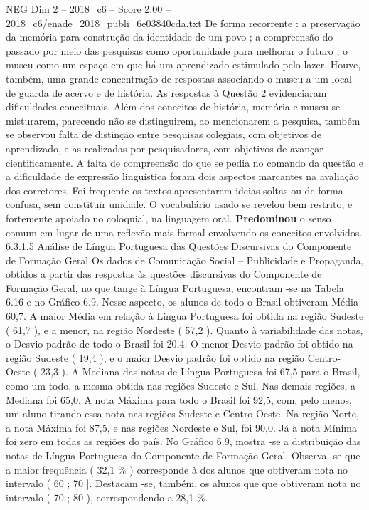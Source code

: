 \begin{textsample}{NEG Dim 2 – 2018\_c6 – Score 2.00 – 2018\_c6/enade\_2018\_publi\_6e03840cda.txt}
De forma recorrente : a preservação da memória para construção da identidade de um povo ; a compreensão do passado por meio das pesquisas como oportunidade para melhorar o futuro ; o museu como um espaço em que há um aprendizado estimulado pelo lazer.
Houve, também, uma grande concentração de respostas associando o museu a um local de guarda de acervo e de história.
As respostas à Questão 2 evidenciaram dificuldades conceituais.
Além dos conceitos de história, memória e museu se misturarem, parecendo não se distinguirem, ao mencionarem a pesquisa, também se observou falta de distinção entre pesquisas colegiais, com objetivos de aprendizado, e as realizadas por pesquisadores, com objetivos de avançar cientificamente.
A falta de compreensão do que se pedia no comando da questão e a dificuldade de expressão linguística foram dois aspectos marcantes na avaliação dos corretores.
Foi frequente os textos apresentarem ideias soltas ou de forma confusa, sem constituir unidade.
O vocabulário usado se revelou bem restrito, e fortemente apoiado no coloquial, na linguagem oral. \textbf{Predominou} o senso comum em lugar de uma reflexão mais formal envolvendo os conceitos envolvidos. 6.3.1.5 Análise de Língua Portuguesa das Questões Discursivas do Componente de Formação Geral Os dados de Comunicação Social – Publicidade e Propaganda, obtidos a partir das respostas às questões discursivas do Componente de Formação Geral, no que tange à Língua Portuguesa, encontram -se na Tabela 6.16 e no Gráfico 6.9.
Nesse aspecto, os alunos de todo o Brasil obtiveram Média 60,7.
A maior Média em relação à Língua Portuguesa foi obtida na região Sudeste ( 61,7 ), e a menor, na região Nordeste ( 57,2 ).
Quanto à variabilidade das notas, o Desvio padrão de todo o Brasil foi 20,4.
O menor Desvio padrão foi obtido na região Sudeste ( 19,4 ), e o maior Desvio padrão foi obtido na região Centro-Oeste ( 23,3 ).
A Mediana das notas de Língua Portuguesa foi 67,5 para o Brasil, como um todo, a mesma obtida nas regiões Sudeste e Sul.
Nas demais regiões, a Mediana foi 65,0.
A nota Máxima para todo o Brasil foi 92,5, com, pelo menos, um aluno tirando essa nota nas regiões Sudeste e Centro-Oeste.
Na região Norte, a nota Máxima foi 87,5, e nas regiões Nordeste e Sul, foi 90,0.
Já a nota Mínima foi zero em todas as regiões do país.
No Gráfico 6.9, mostra -se a distribuição das notas de Língua Portuguesa do Componente de Formação Geral.
Observa -se que a maior frequência ( 32,1 \% ) corresponde à dos alunos que obtiveram nota no intervalo ( 60 ; 70 ].
Destacam -se, também, os alunos que que obtiveram nota no intervalo ( 70 ; 80 ), correspondendo a 28,1 \%.

\end{textsample}
